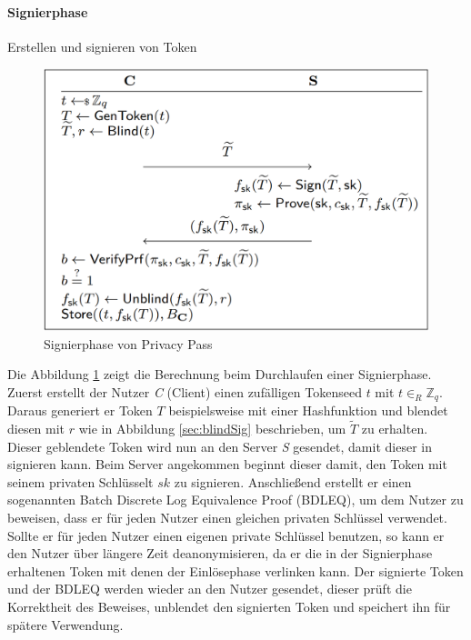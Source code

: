 \documentclass{scrreprt}
\begin{document}
\paragraph{Signierphase} Erstellen und signieren von Token

\begin{figure}[H]
    \centering
    \includegraphics[width=0.5\linewidth]{pp_signphase.png}
    \caption{Signierphase von Privacy Pass \cite{pp-davidson2018privacy}}
    \label{fig:pp-signingphase}
\end{figure}
Die Abbildung \ref{fig:pp-signingphase} zeigt die Berechnung beim Durchlaufen einer Signierphase. Zuerst erstellt der Nutzer \textit{C} (Client) einen zufälligen Tokenseed $t$ mit $t {\in}_R \mathbb{Z}_q $. Daraus generiert er Token $T$ beispielsweise mit einer Hashfunktion und blendet diesen mit $r$ wie in Abbildung \ref{sec:blindSig} beschrieben, um $\widetilde{T}$ zu erhalten. Dieser geblendete Token wird nun an den Server \textit{S} gesendet, damit dieser in signieren kann. Beim Server angekommen beginnt dieser damit, den Token mit seinem privaten Schlüsselt $sk$ zu signieren. Anschließend erstellt er einen sogenannten Batch Discrete Log Equivalence Proof (BDLEQ), um dem Nutzer zu beweisen, dass er für jeden Nutzer einen gleichen privaten Schlüssel verwendet. Sollte er für jeden Nutzer einen eigenen private Schlüssel benutzen, so kann er den Nutzer über längere Zeit deanonymisieren, da er die in der Signierphase erhaltenen Token mit denen der Einlösephase verlinken kann. Der signierte Token und der BDLEQ werden wieder an den Nutzer gesendet, dieser prüft die Korrektheit des Beweises, unblendet den signierten Token und speichert ihn für spätere Verwendung. 
\end{document}
